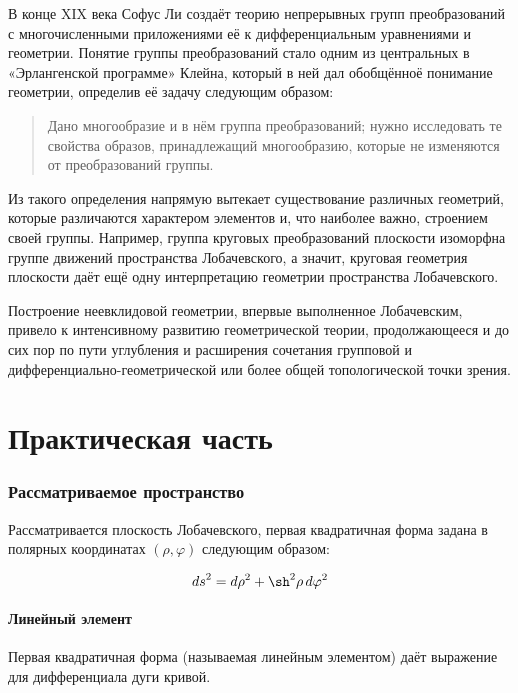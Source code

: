 \documentclass{article}
\numberwithin{equation}{section}
\renewcommand{\phi}{\varphi}
\begin{document}


В конце XIX века Софус Ли создаёт теорию непрерывных групп
преобразований с многочисленными приложениями её к дифференциальным
уравнениями и геометрии. Понятие группы преобразований стало одним из
центральных в «Эрлангенской программе» Клейна, который в ней дал
обобщённоё понимание геометрии, определив её задачу следующим образом:

\begin{quote}
  Дано многообразие и в нём группа преобразований; нужно исследовать
  те свойства образов, принадлежащий многообразию, которые не
  изменяются от преобразований группы.
\end{quote}

Из такого определения напрямую вытекает существование различных
геометрий, которые различаются характером элементов и, что наиболее
важно, строением своей группы. Например, группа круговых
преобразований плоскости изоморфна группе движений пространства
Лобачевского, а значит, круговая геометрия плоскости даёт ещё одну
интерпретацию геометрии пространства Лобачевского.

Построение неевклидовой геометрии, впервые выполненное Лобачевским,
привело к интенсивному развитию геометрической теории, продолжающееся
и до сих пор по пути углубления и расширения сочетания групповой и
дифференциально-геометрической или более общей топологической точки
зрения.

\clearpage
\part{Практическая часть}

\section{Рассматриваемое пространство}

Рассматривается плоскость Лобачевского, первая квадратичная форма
задана в полярных координатах $(\rho, \phi)$ следующим образом:

\begin{equation}\label{eq:lin-elt}
  {ds}^2 = d\rho^2+\sh^2{\rho}\,d\phi^2
\end{equation}

\subsection{Линейный элемент}

Первая квадратичная форма (называемая линейным элементом) даёт
выражение для дифференциала дуги кривой.
\end{document}
